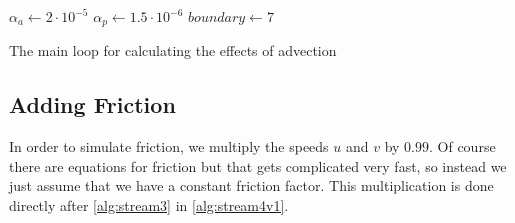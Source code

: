 \begin{algorithm}
    $\alpha_a \leftarrow 2 \cdot 10^{-5}$ \;
    $\alpha_p \leftarrow 1.5 \cdot 10^{-6}$ \;
    $boundary \leftarrow 7$ \;
    \caption{The main loop for calculating the effects of advection}
    \label{alg:advectionfix}
\end{algorithm}

\subsection{Adding Friction}
In order to simulate friction, we multiply the speeds $u$ and $v$ by $0.99$. Of course there are equations for friction but that gets complicated very fast, so instead we just assume that we
have a constant friction factor. This multiplication is done directly after \autoref{alg:stream3} in \autoref{alg:stream4v1}.